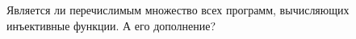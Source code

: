 Является ли перечислимым множество всех программ, вычисляющих инъективные функции. А его дополнение?